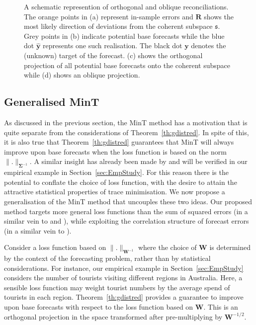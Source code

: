 \documentclass[12pt]{article}
\theoremstyle{definition}
\begin{document}
\begin{figure}[!p]
\begin{subfigure}[!h]{0.415\textwidth}
      \caption{}
  \end{subfigure}
  \caption{A schematic represention of orthogonal and oblique reconciliations. The orange points in (a) represent in-sample errors and $\bm{R}$ shows the most likely direction of deviations from the coherent subspace $\mathfrak{s}$. Grey points in (b) indicate potential base forecasts while the blue dot ${\hat{\bm y}}$ represents one such realisation. The black dot ${\bm y}$ denotes the (unknown) target of the forecast. (c) shows the orthogonal projection of all potential base forecasts onto the coherent subspace while (d) shows an oblique projection.}\label{fig:OthogonalVSOblique_projection}
\end{figure}

{\color{blue}

\subsection{Generalised MinT}

As discussed in the previous section, the MinT method has a motivation that is quite separate from the considerations of Theorem~\ref{th:gdistred}.  In spite of this, it is also true that Theorem~\ref{th:gdistred} guarantees that MinT will always improve upon base forecasts when the loss function is based on the norm $\|.\|_{\bm{\Sigma}^{-1}}$. A similar insight has already been made by \cite{VanErven2015a} and will be verified in our empirical example in Section~\ref{sec:EmpStudy}.  For this reason there is the potential to conflate the choice of loss function, with the desire to attain the attractive statistical properties of trace minimisation.  We now propose a generalisation of the MinT method that uncouples these two ideas.  Our proposed method targets more general loss functions than the sum of squared errors (in a similar vein to \cite{VanErven2015a} and \cite{NysEtAl2019}), while exploiting the correlation structure of forecast errors (in a similar vein to \cite{WicEtAl2019}).

Consider a loss function based on $\|.\|_{\bm{W}^{-1}}$ where the choice of $\bm{W}$ is determined by the context of the forecasting problem, rather than by statistical considerations.  For instance, our empirical example in Section~\ref{sec:EmpStudy} considers the number of tourists visiting different regions in Australia. Here, a sensible loss function may weight tourist numbers by the average spend of tourists in each region.  Theorem~\ref{th:gdistred} provides a guarantee to improve upon base forecasts with respect to the loss function based on $\bm{W}$.  This is an orthogonal projection in the space transformed after pre-multiplying by ${\bm W}^{-1/2}$.

}
\end{document}
